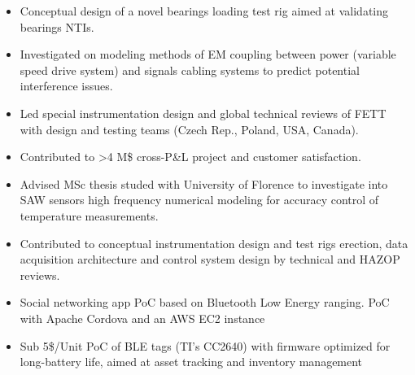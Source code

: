 \documentclass[9pt,a4paper,ragged2e,withhyper]{altacv} %
\begin{document}
\begin{paracol}{2}

\begin{itemize}
  \item Conceptual design of a novel bearings loading test rig aimed at validating bearings NTIs. 
  \item Investigated on modeling methods of EM coupling between power (variable speed drive system) 
  and signals cabling systems to predict potential interference issues.
\end{itemize}
\divider

\begin{itemize}
  \item Led special instrumentation design and global technical reviews of FETT with design
and testing teams (Czech Rep., Poland, USA, Canada).
  \item Contributed to >4 M\$ cross-P\&L project and customer satisfaction.
\end{itemize}
\divider

\begin{itemize}
\item Advised MSc thesis studed with University of Florence to investigate into SAW sensors high frequency numerical modeling for accuracy control of temperature measurements.\end{itemize}
\divider

\begin{itemize}
\item Contributed to conceptual instrumentation design and test rigs erection, data
acquisition architecture and control system design by technical and HAZOP reviews.
\end{itemize}
\divider

\begin{itemize}
\item Social networking app PoC based on Bluetooth Low Energy ranging. PoC with Apache
Cordova and an AWS EC2 instance
\end{itemize}
\divider

\begin{itemize}
\item Sub 5\$/Unit PoC of BLE tags (TI's CC2640) with firmware optimized for long-battery
life, aimed at asset tracking and inventory management
\end{itemize}
\divider


\end{paracol}
\end{document}
